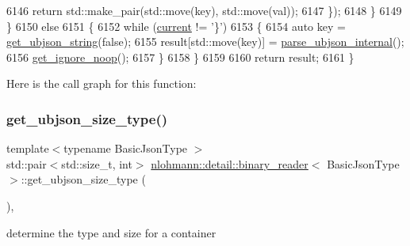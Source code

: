 \begin{DoxyCode}
6146                     \textcolor{keywordflow}{return} std::make\_pair(std::move(key), std::move(val));
6147                 \});
6148             \}
6149         \}
6150         \textcolor{keywordflow}{else}
6151         \{
6152             \textcolor{keywordflow}{while} (\hyperlink{classnlohmann_1_1detail_1_1binary__reader_a7e994e201b215cd6d6ae28a1853f43e0}{current} != \textcolor{charliteral}{'\}'})
6153             \{
6154                 \textcolor{keyword}{auto} key = \hyperlink{classnlohmann_1_1detail_1_1binary__reader_ae4097317b979174cc366b076bb879814}{get\_ubjson\_string}(\textcolor{keyword}{false});
6155                 result[std::move(key)] = \hyperlink{classnlohmann_1_1detail_1_1binary__reader_a439e369278be4412b05f3481c226eafa}{parse\_ubjson\_internal}();
6156                 \hyperlink{classnlohmann_1_1detail_1_1binary__reader_a372a4b61f0c57f3d4f1e9484a416a3cd}{get\_ignore\_noop}();
6157             \}
6158         \}
6159 
6160         \textcolor{keywordflow}{return} result;
6161     \}
\end{DoxyCode}
Here is the call graph for this function\+:
\mbox{\label{classnlohmann_1_1detail_1_1binary__reader_a480aae640bb92a7432c0f758081a2cc7}} 
\subsubsection{\texorpdfstring{get\+\_\+ubjson\+\_\+size\+\_\+type()}{get\_ubjson\_size\_type()}}
{\footnotesize\ttfamily template$<$typename Basic\+Json\+Type $>$ \\
std\+::pair$<$std\+::size\+\_\+t, int$>$ \hyperlink{classnlohmann_1_1detail_1_1binary__reader}{nlohmann\+::detail\+::binary\+\_\+reader}$<$ Basic\+Json\+Type $>$\+::get\+\_\+ubjson\+\_\+size\+\_\+type (\begin{DoxyParamCaption}{ }\end{DoxyParamCaption})\hspace{0.3cm}{\ttfamily [inline]}, {\ttfamily [private]}}



determine the type and size for a container 

